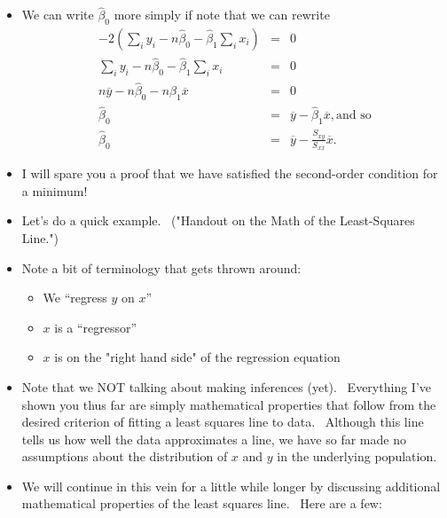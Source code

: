 \documentclass[11pt]{article}
\begin{document}
\begin{itemize}
\item We can write $\widehat{\beta }_{0}$ more simply if note that we can
rewrite%
\begin{eqnarray*}
-2\left( \sum\nolimits_{i}y_{i}-n\widehat{\beta }_{0}-\widehat{\beta }%
_{1}\sum\nolimits_{i}x_{i}\right) &=&0 \\
\sum\nolimits_{i}y_{i}-n\widehat{\beta }_{0}-\widehat{\beta }%
_{1}\sum\nolimits_{i}x_{i} &=&0 \\
n\overline{y}-n\widehat{\beta }_{0}-n\widehat{\beta }_{1}\overline{x} &=&0 \\
\widehat{\beta }_{0} &=&\overline{y}-\widehat{\beta }_{1}\overline{x},\text{
and so} \\
\widehat{\beta }_{0} &=&\overline{y}-\frac{S_{xy}}{S_{xx}}\overline{x}.
\end{eqnarray*}

\item I will spare you a proof that we have satisfied the second-order
condition for a minimum!

\item Let's do a quick example. \ ("Handout on the Math of the Least-Squares
Line.")

\item Note a bit of terminology that gets thrown around:

\begin{itemize}
\item We \textquotedblleft regress $y$ on $x$\textquotedblright

\item $x$ is a \textquotedblleft regressor\textquotedblright

\item $x$ is on the "right hand side" of the regression equation
\end{itemize}

\item Note that we NOT talking about making inferences (yet). \ Everything
I've shown you thus far are simply mathematical properties that follow from
the desired criterion of fitting a least squares line to data. \ Although
this line tells us how well the data approximates a line, we have so far
made no assumptions about the distribution of $x$ and $y$ in the underlying
population. \ 

\item We will continue in this vein for a little while longer by discussing
additional mathematical properties of the least squares line. \ Here are a
few:


\end{itemize}
\end{document}
